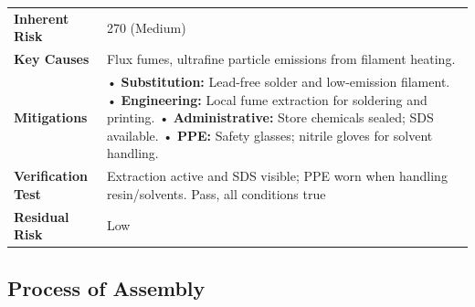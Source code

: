 \begin{tabular}{@{}p{3cm}p{13cm}@{}}
\toprule
\textbf{Inherent Risk} & 270 (Medium) \\
\textbf{Key Causes} & Flux fumes, ultrafine particle emissions from filament heating. \\
\textbf{Mitigations} &
• \textbf{Substitution:} Lead-free solder and low-emission filament. \newline
• \textbf{Engineering:} Local fume extraction for soldering and printing. \newline
• \textbf{Administrative:} Store chemicals sealed; SDS available. \newline
• \textbf{PPE:} Safety glasses; nitrile gloves for solvent handling. \\
\textbf{Verification Test} & Extraction active and SDS visible; PPE worn when handling resin/solvents. Pass, all conditions true \\
\textbf{Residual Risk} & Low \\
\bottomrule
\end{tabular}

\subsection{Process of Assembly}

